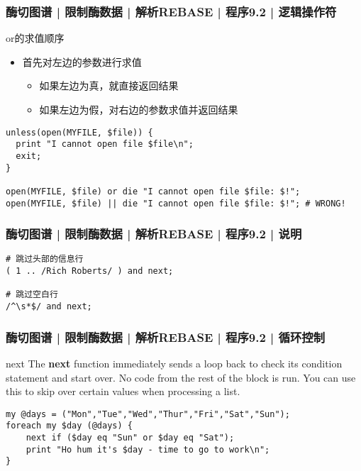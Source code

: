 \begin{frame}[fragile]
  \frametitle{酶切图谱 | 限制酶数据 | 解析REBASE | 程序9.2 | \alert{逻辑操作符}}
  \begin{block}{or的求值顺序}
    \begin{itemize}
      \item 首先对左边的参数进行求值
	\begin{itemize}
	  \item 如果左边为真，就直接返回结果
	  \item 如果左边为假，对右边的参数求值并返回结果
	\end{itemize}
    \end{itemize}
  \end{block}
  \pause
  \vspace{-0.5em}
\begin{lstlisting}
unless(open(MYFILE, $file)) {
  print "I cannot open file $file\n";
  exit;
}

open(MYFILE, $file) or die "I cannot open file $file: $!";
open(MYFILE, $file) || die "I cannot open file $file: $!"; # WRONG!
\end{lstlisting}
\end{frame}

\begin{frame}[fragile]
  \frametitle{酶切图谱 | 限制酶数据 | 解析REBASE | 程序9.2 | 说明}
\begin{lstlisting}
# 跳过头部的信息行
( 1 .. /Rich Roberts/ ) and next;

# 跳过空白行
/^\s*$/ and next;
\end{lstlisting}
\end{frame}

\begin{frame}[fragile]
  \frametitle{酶切图谱 | 限制酶数据 | 解析REBASE | 程序9.2 | 循环控制}
  \begin{block}{next}
    The \textbf{next} function immediately sends a loop back to check its condition statement and start over. No code from the rest of the block is run. You can use this to skip over certain values when processing a list.
  \end{block}
  \pause
\begin{lstlisting}
my @days = ("Mon","Tue","Wed","Thur","Fri","Sat","Sun");
foreach my $day (@days) {
    next if ($day eq "Sun" or $day eq "Sat");
    print "Ho hum it's $day - time to go to work\n";
}
\end{lstlisting}
\end{frame}

